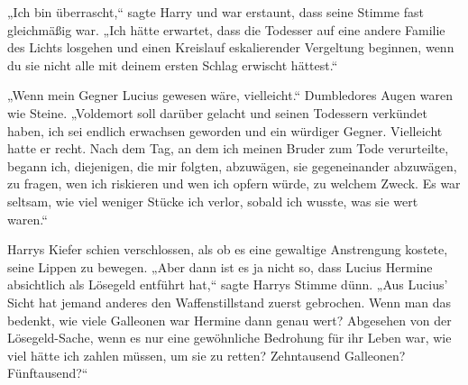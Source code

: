 „Ich bin überrascht,“ sagte Harry und war erstaunt, dass seine Stimme fast gleichmäßig war. „Ich hätte erwartet, dass die Todesser auf eine andere Familie des Lichts losgehen und einen Kreislauf eskalierender Vergeltung beginnen, wenn du sie nicht alle mit deinem ersten Schlag erwischt hättest.“

„Wenn mein Gegner Lucius gewesen wäre, vielleicht.“
Dumbledores Augen waren wie Steine.
„Voldemort soll darüber gelacht und seinen Todessern verkündet haben, ich sei endlich erwachsen geworden und ein würdiger Gegner. Vielleicht hatte er recht. Nach dem Tag, an dem ich meinen Bruder zum Tode verurteilte, begann ich, diejenigen, die mir folgten, abzuwägen, sie gegeneinander abzuwägen, zu fragen, wen ich riskieren und wen ich opfern würde, zu welchem Zweck. Es war seltsam, wie viel weniger Stücke ich verlor, sobald ich wusste, was sie wert waren.“

Harrys Kiefer schien verschlossen, als ob es eine gewaltige Anstrengung kostete, seine Lippen zu bewegen.
„Aber dann ist es ja nicht so, dass Lucius Hermine absichtlich als Lösegeld entführt hat,“ sagte Harrys Stimme dünn. „Aus Lucius' Sicht hat jemand anderes den Waffenstillstand zuerst gebrochen. Wenn man das bedenkt, wie viele Galleonen war Hermine dann genau wert? Abgesehen von der Lösegeld-Sache, wenn es nur eine gewöhnliche Bedrohung für ihr Leben war, wie viel hätte ich zahlen müssen, um sie zu retten? Zehntausend Galleonen? Fünftausend?“

